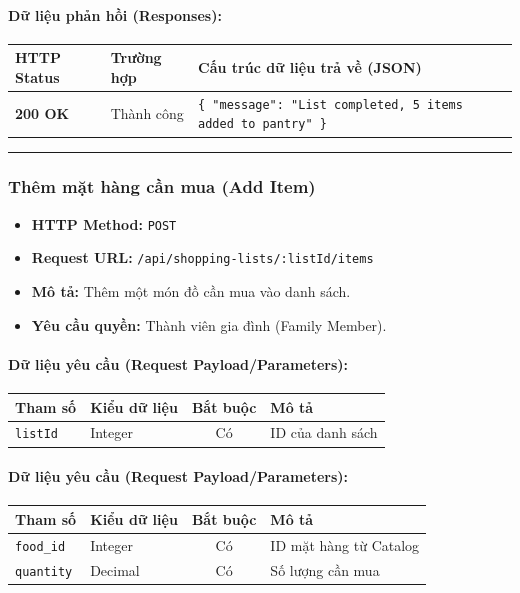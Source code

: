 \documentclass[12pt,a4paper]{article}
\begin{document}
\paragraph{Dữ liệu phản hồi (Responses):}
\begin{longtable}{|>{\raggedright\arraybackslash}p{2.8cm}|>{\raggedright\arraybackslash}p{3.2cm}|>{\raggedright\arraybackslash}p{8.0cm}|}
\hline
\textbf{HTTP Status} & \textbf{Trường hợp} & \textbf{Cấu trúc dữ liệu trả về (JSON)} \\ \hline
\endhead
\textbf{200 OK} & Thành công & \texttt{\{ "message": "List completed, 5 items added to pantry" \}} \\ \hline
\end{longtable}

\vskip 0.4cm
\noindent\rule{\textwidth}{0.3pt}
\vskip 0.4cm

\subsubsection{Thêm mặt hàng cần mua (Add Item)}
\begin{itemize}[leftmargin=*]
    \item \textbf{HTTP Method:} \texttt{POST}
    \item \textbf{Request URL:} \texttt{/api/shopping-lists/:listId/items}
    \item \textbf{Mô tả:} Thêm một món đồ cần mua vào danh sách.
    \item \textbf{Yêu cầu quyền:} Thành viên gia đình (Family Member).
\end{itemize}

\paragraph{Dữ liệu yêu cầu (Request Payload/Parameters):}
\begin{longtable}{|>{\raggedright\arraybackslash}p{2.8cm}|>{\raggedright\arraybackslash}p{2.2cm}|c|>{\raggedright\arraybackslash}p{7.0cm}|}
\hline
\textbf{Tham số} & \textbf{Kiểu dữ liệu} & \textbf{Bắt buộc} & \textbf{Mô tả} \\ \hline
\endhead
\texttt{listId} & Integer & Có & ID của danh sách \\ \hline
\end{longtable}

\paragraph{Dữ liệu yêu cầu (Request Payload/Parameters):}
\begin{longtable}{|>{\raggedright\arraybackslash}p{2.8cm}|>{\raggedright\arraybackslash}p{2.2cm}|c|>{\raggedright\arraybackslash}p{7.0cm}|}
\hline
\textbf{Tham số} & \textbf{Kiểu dữ liệu} & \textbf{Bắt buộc} & \textbf{Mô tả} \\ \hline
\endhead
\texttt{food\_id} & Integer & Có & ID mặt hàng từ Catalog \\ \hline
\texttt{quantity} & Decimal & Có & Số lượng cần mua \\ \hline
\end{longtable}
\end{document}

